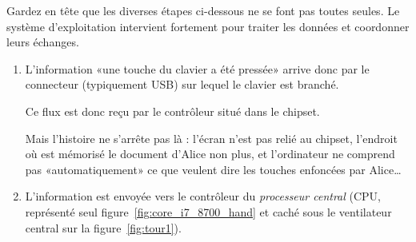 Gardez en tête que les diverses étapes ci-dessous ne se font pas toutes seules. Le système d'exploitation intervient fortement pour traiter les données et coordonner leurs échanges. 
\begin{enumerate}
	\item L'information «une touche du clavier a été pressée» arrive donc par le connecteur (typiquement USB) sur lequel le clavier est branché. 
	
	 Ce flux est donc reçu par le contrôleur situé dans le chipset.
	
	Mais l'histoire ne s'arrête pas là : l'écran n'est pas relié au chipset, l'endroit où est mémorisé le document d'Alice non plus, et l'ordinateur ne comprend pas «automatiquement» ce que veulent dire les touches enfoncées par Alice\dots
	\item L'information est envoyée vers le contrôleur du \emph{processeur central} (CPU, représenté seul figure~\ref{fig:core_i7_8700_hand} et caché sous le ventilateur central sur la figure~\ref{fig:tour1}). 
	

\end{enumerate}
